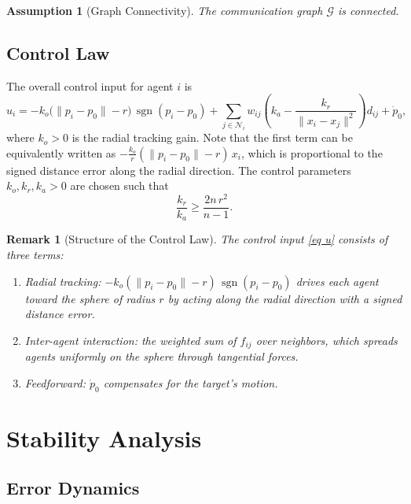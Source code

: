 \documentclass{ctexart}
\DeclareMathOperator{\sgn}{sgn}
\newtheorem{remark}[theorem]{Remark}
\newtheorem{assumption}[theorem]{Assumption}
\begin{document}
\begin{assumption}[Graph Connectivity]
The communication graph $\mathcal{G}$ is connected.
\end{assumption}

\subsection*{Control Law}

The overall control input for agent $i$ is
\begin{equation}
u_i =
-k_o\bigl(\|p_i - p_0\| - r\bigr)\,\sgn(p_i - p_0)
+ \sum_{j \in \mathcal{N}_i} w_{ij} \left(k_a - \frac{k_r}{\|x_i - x_j\|^2}\right) d_{ij}
+ \dot{p}_0,
\label{eq u}
\end{equation}
where $k_o > 0$ is the radial tracking gain. Note that the first term can be equivalently written as $-\frac{k_o}{r}(\|p_i - p_0\| - r)\,x_i$, which is proportional to the signed distance error along the radial direction.
The control parameters $k_o, k_r, k_a > 0$ are chosen such that
\begin{equation}
\frac{k_r}{k_a} \geq \frac{2n\,r^2}{n-1}.
\label{eq:gain_condition}
\end{equation}

\begin{remark}[Structure of the Control Law]
The control input \eqref{eq u} consists of three terms:
\begin{enumerate}
    \item \emph{Radial tracking}: $-k_o(\|p_i - p_0\| - r)\,\sgn(p_i - p_0)$ drives each agent toward the sphere of radius $r$ by acting along the radial direction with a signed distance error.
    \item \emph{Inter-agent interaction}: the weighted sum of $f_{ij}$ over neighbors, which spreads agents uniformly on the sphere through tangential forces.
    \item \emph{Feedforward}: $\dot{p}_0$ compensates for the target's motion.
\end{enumerate}
\end{remark}

\section{Stability Analysis}

\subsection*{Error Dynamics}
\end{document}

